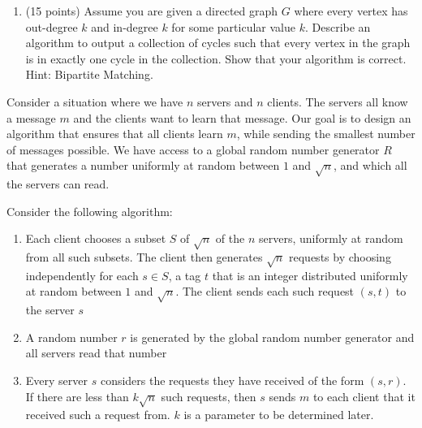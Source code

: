 \documentclass[11pt]{article}
\newcommand{\ans}[1]{ }
\begin{document}
\begin{enumerate}
\begin{enumerate}
 
 \pagebreak
 
 
 \item (15 points) Assume you are given a directed graph $G$ where every vertex has out-degree $k$ and in-degree $k$ for some particular value $k$.  Describe an algorithm to output a collection of cycles such that every vertex in the graph is in exactly one cycle in the collection.  Show that your algorithm is correct.  Hint: Bipartite Matching.

\ans{Set up bipartite graph with all nodes in $G$ on left side and copies of all nodes on right.  Edges in this graph are edges from $G$, all going from left to right.  Because the graph is $k$ regular, Hall's Theorem applies.  Why?  We can thus find a perfect matching using network flow and this matching will induce the collection of cycles desired.}

\end{enumerate}




Consider a situation where we have $n$ servers and $n$ clients.  The servers all know a message $m$ and the clients want to learn that message.  Our goal is to design an algorithm that ensures that all clients learn $m$, while sending the smallest number of messages possible.  We have access to a global random number generator $R$ that generates a number uniformly at random between $1$ and $\sqrt{n}$, and which all the servers can read.

Consider the following algorithm:

\begin{enumerate}
\item Each client chooses a subset $S$ of $\sqrt{n}$ of the $n$ servers, uniformly at random from all such subsets.  The client then generates $\sqrt{n}$ requests by choosing independently for each $s \in S$, a tag $t$ that is an integer distributed uniformly at random between $1$ and $\sqrt{n}$.  The client sends each such request $(s,t)$ to the server $s$
\item A random number $r$ is generated by the global random number generator and all servers read that number
\item Every server $s$ considers the requests they have received of the form $(s,r)$.  If there are less than $k \sqrt{n}$ such requests, then $s$ sends $m$ to each client that it received such a request from.  $k$ is a parameter to be determined later.
\end{enumerate}


\end{enumerate}
\end{document}
